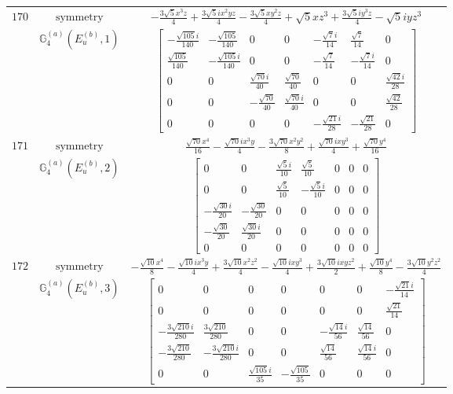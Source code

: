 \documentclass[fleqn,8pt,landscape]{jsarticle}
\begin{document}
\begin{longtable}{ccc}
$ 170 $ & $ \text{symmetry} $ & $ - \frac{3 \sqrt{5} x^{3} z}{4} + \frac{3 \sqrt{5} i x^{2} y z}{4} - \frac{3 \sqrt{5} x y^{2} z}{4} + \sqrt{5} x z^{3} + \frac{3 \sqrt{5} i y^{3} z}{4} - \sqrt{5} i y z^{3} $ \\
$  $ & $ \mathbb{G}_{4}^{(a)}(E_{u}^{(b)},1) $ & $ \begin{bmatrix} - \frac{\sqrt{105} i}{140} & - \frac{\sqrt{105}}{140} & 0 & 0 & - \frac{\sqrt{7} i}{14} & \frac{\sqrt{7}}{14} & 0 \\ \frac{\sqrt{105}}{140} & - \frac{\sqrt{105} i}{140} & 0 & 0 & - \frac{\sqrt{7}}{14} & - \frac{\sqrt{7} i}{14} & 0 \\ 0 & 0 & \frac{\sqrt{70} i}{40} & \frac{\sqrt{70}}{40} & 0 & 0 & \frac{\sqrt{42} i}{28} \\ 0 & 0 & - \frac{\sqrt{70}}{40} & \frac{\sqrt{70} i}{40} & 0 & 0 & \frac{\sqrt{42}}{28} \\ 0 & 0 & 0 & 0 & - \frac{\sqrt{21} i}{28} & - \frac{\sqrt{21}}{28} & 0 \end{bmatrix} $ \\ \hline
$ 171 $ & $ \text{symmetry} $ & $ \frac{\sqrt{70} x^{4}}{16} - \frac{\sqrt{70} i x^{3} y}{4} - \frac{3 \sqrt{70} x^{2} y^{2}}{8} + \frac{\sqrt{70} i x y^{3}}{4} + \frac{\sqrt{70} y^{4}}{16} $ \\
$  $ & $ \mathbb{G}_{4}^{(a)}(E_{u}^{(b)},2) $ & $ \begin{bmatrix} 0 & 0 & \frac{\sqrt{5} i}{10} & \frac{\sqrt{5}}{10} & 0 & 0 & 0 \\ 0 & 0 & \frac{\sqrt{5}}{10} & - \frac{\sqrt{5} i}{10} & 0 & 0 & 0 \\ - \frac{\sqrt{30} i}{20} & - \frac{\sqrt{30}}{20} & 0 & 0 & 0 & 0 & 0 \\ - \frac{\sqrt{30}}{20} & \frac{\sqrt{30} i}{20} & 0 & 0 & 0 & 0 & 0 \\ 0 & 0 & 0 & 0 & 0 & 0 & 0 \end{bmatrix} $ \\ \hline
$ 172 $ & $ \text{symmetry} $ & $ - \frac{\sqrt{10} x^{4}}{8} - \frac{\sqrt{10} i x^{3} y}{4} + \frac{3 \sqrt{10} x^{2} z^{2}}{4} - \frac{\sqrt{10} i x y^{3}}{4} + \frac{3 \sqrt{10} i x y z^{2}}{2} + \frac{\sqrt{10} y^{4}}{8} - \frac{3 \sqrt{10} y^{2} z^{2}}{4} $ \\
$  $ & $ \mathbb{G}_{4}^{(a)}(E_{u}^{(b)},3) $ & $ \begin{bmatrix} 0 & 0 & 0 & 0 & 0 & 0 & - \frac{\sqrt{21} i}{14} \\ 0 & 0 & 0 & 0 & 0 & 0 & \frac{\sqrt{21}}{14} \\ - \frac{3 \sqrt{210} i}{280} & \frac{3 \sqrt{210}}{280} & 0 & 0 & - \frac{\sqrt{14} i}{56} & \frac{\sqrt{14}}{56} & 0 \\ - \frac{3 \sqrt{210}}{280} & - \frac{3 \sqrt{210} i}{280} & 0 & 0 & \frac{\sqrt{14}}{56} & \frac{\sqrt{14} i}{56} & 0 \\ 0 & 0 & \frac{\sqrt{105} i}{35} & - \frac{\sqrt{105}}{35} & 0 & 0 & 0 \end{bmatrix} $ \\ \hline

\end{longtable}
\end{document}
